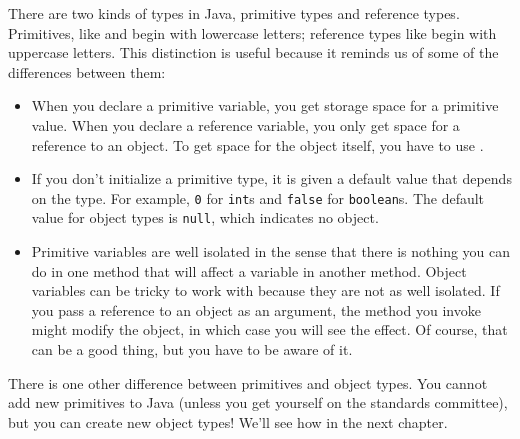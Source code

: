 
There are two kinds of types in Java, primitive types and reference types.
Primitives, like  and  begin with lowercase letters; reference types like  begin with uppercase letters.
This distinction is useful because it reminds us of some of the differences between them:

\begin{itemize}

\item When you declare a primitive variable, you get storage space for a primitive value.
When you declare a reference variable, you only get space for a reference to an object.
To get space for the object itself, you have to use .

\item If you don't initialize a primitive type, it is given a default value that depends on the type.
For example, {\tt 0} for {\tt int}s and {\tt false} for {\tt boolean}s.
The default value for object types is {\tt null}, which indicates no object.

\item Primitive variables are well isolated in the sense that there is nothing you can do in one method that will affect a variable in another method.
Object variables can be tricky to work with because they are not as well isolated.
If you pass a reference to an object as an argument, the method you invoke might modify the object, in which case you will see the effect.
Of course, that can be a good thing, but you have to be aware of it.

\end{itemize}

There is one other difference between primitives and object types.
You cannot add new primitives to Java (unless you get yourself on the standards committee), but you can create new object types!  We'll see how in the next chapter.


